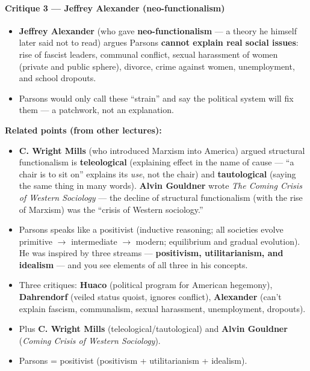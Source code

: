 \paragraph{Critique 3 --- Jeffrey Alexander (neo-functionalism)}
\begin{CriticalPoint}
\begin{itemize}
\item \textbf{Jeffrey Alexander} (who gave \textbf{neo-functionalism} --- a theory he himself later said not to read) argues Parsons \textbf{cannot explain real social issues}: rise of fascist leaders, communal conflict, sexual harassment of women (private and public sphere), divorce, crime against women, unemployment, and school dropouts.
\item Parsons would only call these ``strain'' and say the political system will fix them --- a patchwork, not an explanation.
\end{itemize}
\end{CriticalPoint}

\begin{DataFact}
\textbf{Related points (from other lectures):}
\begin{itemize}
\item \textbf{C. Wright Mills} (who introduced Marxism into America) argued structural functionalism is \textbf{teleological} (explaining effect in the name of cause --- ``a chair is to sit on'' explains its \textit{use}, not the chair) and \textbf{tautological} (saying the same thing in many words). \textbf{Alvin Gouldner} wrote \textit{The Coming Crisis of Western Sociology} --- the decline of structural functionalism (with the rise of Marxism) was the ``crisis of Western sociology.''
\end{itemize}
\end{DataFact}

\begin{CriticalPoint}
\begin{itemize}
\item Parsons speaks like a positivist (inductive reasoning; all societies evolve primitive $\rightarrow$ intermediate $\rightarrow$ modern; equilibrium and gradual evolution). He was inspired by three streams --- \textbf{positivism, utilitarianism, and idealism} --- and you see elements of all three in his concepts.
\end{itemize}
\end{CriticalPoint}

\begin{QuickRevision}
\begin{itemize}
\item Three critiques: \textbf{Huaco} (political program for American hegemony), \textbf{Dahrendorf} (veiled status quoist, ignores conflict), \textbf{Alexander} (can't explain fascism, communalism, sexual harassment, unemployment, dropouts).
\item Plus \textbf{C. Wright Mills} (teleological/tautological) and \textbf{Alvin Gouldner} (\textit{Coming Crisis of Western Sociology}).
\item Parsons = positivist (positivism + utilitarianism + idealism).
\end{itemize}
\end{QuickRevision}

